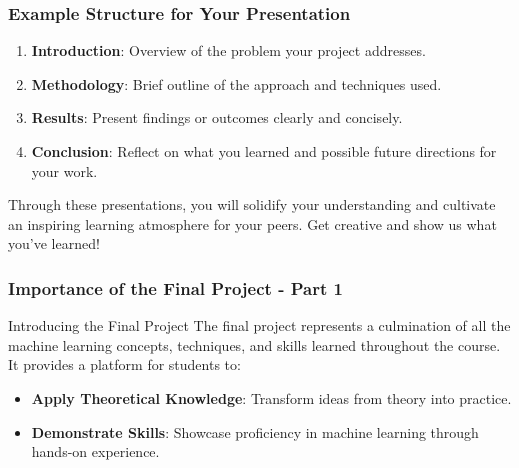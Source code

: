 \documentclass[aspectratio=169]{beamer}
\begin{document}
\begin{frame}[fragile]
    \frametitle{Example Structure for Your Presentation}
    \begin{enumerate}
        \item \textbf{Introduction}: Overview of the problem your project addresses.
        \item \textbf{Methodology}: Brief outline of the approach and techniques used.
        \item \textbf{Results}: Present findings or outcomes clearly and concisely.
        \item \textbf{Conclusion}: Reflect on what you learned and possible future directions for your work.
    \end{enumerate}

    Through these presentations, you will solidify your understanding and cultivate an inspiring learning atmosphere for your peers. Get creative and show us what you've learned!
\end{frame}

\begin{frame}[fragile]
    \frametitle{Importance of the Final Project - Part 1}
    \begin{block}{Introducing the Final Project}
        The final project represents a culmination of all the machine learning concepts, techniques, and skills learned throughout the course. It provides a platform for students to:
    \end{block}
    \begin{itemize}
        \item \textbf{Apply Theoretical Knowledge}: Transform ideas from theory into practice.
        \item \textbf{Demonstrate Skills}: Showcase proficiency in machine learning through hands-on experience.
    \end{itemize}
\end{frame}
\end{document}
